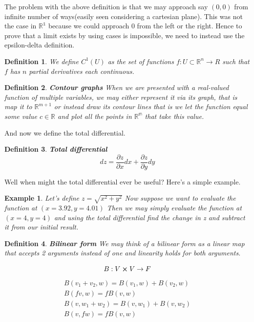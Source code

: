 \documentclass[titlepage]{article}
\newtheorem{definition}{Definition}
\newcommand{\Rn}{\mathbb{R}^n}
\newtheorem{example}{Example}[section]
\begin{document}
The problem with the above definition is that we may approach say $(0,0)$ from infinite number of ways(easily seen considering a cartesian plane). This was not the case in $\mathbb{R^{1}}$ because we could approach 0 from the left or the right. Hence to prove that a limit exists by using cases is impossible, we need to instead use the epsilon-delta definition. 


\begin{definition}
We define $C^{1}(U)$ as the set of functions $f: U\subset \Rn \to R$ such that $f$ has $n$ partial derivatives each continuous. 
\end{definition}

\begin{definition}\textbf{Contour graphs}
When we are presented with a real-valued function of multiple variables, we may either represent it via its graph, that is map it to $\mathbb{R}^{m+1}$ or instead draw its contour lines that is we let the function equal some value $c \in \mathbb{R}$ and plot all the points in $\mathbb{R^{m}}$ that take this value.

\end{definition}

And now we define the total differential. 

\begin{definition}\textbf{Total differential}
$$dz = \frac{\partial z}{\partial x}dx + \frac{\partial z}{\partial y}dy$$
\end{definition}

Well when might the total differential ever be useful? Here's a simple example.

\begin{example}
Let's define $z = \sqrt{x^{2} + y^{2}}$ Now suppose we want to evaluate the function at $(x=3.92, y=4.01)$ Then we may simply evaluate the function at $(x=4, y=4)$ and using the total differential find the change in z and subtract it from our initial result. 
\end{example}

\begin{definition}\textbf{Bilinear form}
We may think of a bilinear form as a linear map that accepts 2 arguments instead of one and linearity holds for both arguments. 

$$B: V\cross V \to F$$
\begin{align*}
    B(v_{1}+v_{2},w) = B(v_{1},w) + B(v_{2},w)\\
    B(fv,w) = fB(v,w)\\
    B(v,w_{1} + w_{2}) = B(v,w_{1}) + B(v,w_{2})\\
    B(v,fw) = fB(v,w)
\end{align*}
\end{definition}
\end{document}
